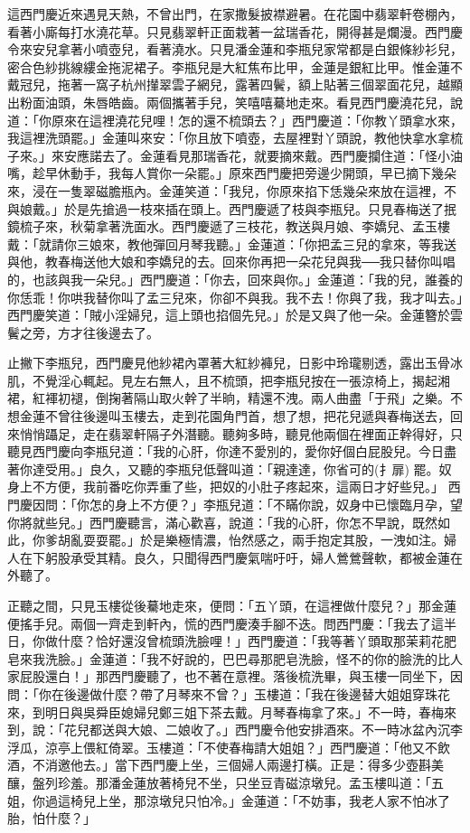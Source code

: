 這西門慶近來遇見天熱，不曾出門，在家撒髮披襟避暑。在花園中翡翠軒卷棚內，看著小廝每打水澆花草。只見翡翠軒正面栽著一盆瑞香花，開得甚是爛漫。西門慶令來安兒拿著小噴壺兒，看著澆水。只見潘金蓮和李瓶兒家常都是白銀條紗衫兒，密合色紗挑線縷金拖泥裙子。李瓶兒是大紅焦布比甲，金蓮是銀紅比甲。惟金蓮不戴冠兒，拖著一窩子杭州攆翠雲子網兒，露著四鬢，額上貼著三個翠面花兒，越顯出粉面油頭，朱唇皓齒。兩個攜著手兒，笑嘻嘻驀地走來。看見西門慶澆花兒，說道：「你原來在這裡澆花兒哩！怎的還不梳頭去？」西門慶道：「你教丫頭拿水來，我這裡洗頭罷。」金蓮叫來安：「你且放下噴壺，去屋裡對丫頭說，教他快拿水拿梳子來。」來安應諾去了。金蓮看見那瑞香花，就要摘來戴。西門慶攔住道：「怪小油嘴，趁早休動手，我每人賞你一朵罷。」原來西門慶把旁邊少開頭，早已摘下幾朵來，浸在一隻翠磁膽瓶內。金蓮笑道：「我兒，你原來掐下恁幾朵來放在這裡，不與娘戴。」於是先搶過一枝來插在頭上。西門慶遞了枝與李瓶兒。只見春梅送了抿鏡梳子來，秋菊拿著洗面水。西門慶遞了三枝花，教送與月娘、李嬌兒、孟玉樓戴：「就請你三娘來，教他彈回月琴我聽。」金蓮道：「你把孟三兒的拿來，等我送與他，教春梅送他大娘和李嬌兒的去。回來你再把一朵花兒與我──我只替你叫唱的，也該與我一朵兒。」西門慶道：「你去，回來與你。」金蓮道：「我的兒，誰養的你恁乖！你哄我替你叫了孟三兒來，你卻不與我。我不去！你與了我，我才叫去。」西門慶笑道：「賊小淫婦兒，這上頭也掐個先兒。」於是又與了他一朵。金蓮簪於雲鬢之旁，方才往後邊去了。

止撇下李瓶兒，西門慶見他紗裙內罩著大紅紗褲兒，日影中玲瓏剔透，露出玉骨冰肌，不覺淫心輒起。見左右無人，且不梳頭，把李瓶兒按在一張涼椅上，揭起湘裙，紅褌初褪，倒掬著隔山取火幹了半晌，精還不洩。兩人曲盡「于飛」之樂。不想金蓮不曾往後邊叫玉樓去，走到花園角門首，想了想，把花兒遞與春梅送去，回來悄悄躡足，走在翡翠軒隔子外潛聽。聽夠多時，聽見他兩個在裡面正幹得好，只聽見西門慶向李瓶兒道：「我的心肝，你達不愛別的，愛你好個白屁股兒。今日盡著你達受用。」良久，又聽的李瓶兒低聲叫道：「親達達，你省可的(扌扉) 罷。奴身上不方便，我前番吃你弄重了些，把奴的小肚子疼起來，這兩日才好些兒。」 西門慶因問：「你怎的身上不方便？」李瓶兒道：「不瞞你說，奴身中已懷臨月孕，望你將就些兒。」西門慶聽言，滿心歡喜，說道：「我的心肝，你怎不早說，既然如此，你爹胡亂耍耍罷。」於是樂極情濃，怡然感之，兩手抱定其股，一洩如注。婦人在下躬股承受其精。良久，只聞得西門慶氣喘吁吁，婦人鶯鶯聲軟，都被金蓮在外聽了。

正聽之間，只見玉樓從後驀地走來，便問：「五丫頭，在這裡做什麼兒？」那金蓮便搖手兒。兩個一齊走到軒內，慌的西門慶湊手腳不迭。問西門慶：「我去了這半日，你做什麼？恰好還沒曾梳頭洗臉哩！」西門慶道：「我等著丫頭取那茉莉花肥皂來我洗臉。」金蓮道：「我不好說的，巴巴尋那肥皂洗臉，怪不的你的臉洗的比人家屁股還白！」那西門慶聽了，也不著在意裡。落後梳洗畢，與玉樓一同坐下，因問：「你在後邊做什麼？帶了月琴來不曾？」玉樓道：「我在後邊替大姐姐穿珠花來，到明日與吳舜臣媳婦兒鄭三姐下茶去戴。月琴春梅拿了來。」不一時，春梅來到，說：「花兒都送與大娘、二娘收了。」西門慶令他安排酒來。不一時冰盆內沉李浮瓜，涼亭上偎紅倚翠。玉樓道：「不使春梅請大姐姐？」西門慶道：「他又不飲酒，不消邀他去。」當下西門慶上坐，三個婦人兩邊打橫。正是：得多少壺斟美釀，盤列珍羞。那潘金蓮放著椅兒不坐，只坐豆青磁涼墩兒。孟玉樓叫道：「五姐，你過這椅兒上坐，那涼墩兒只怕冷。」金蓮道：「不妨事，我老人家不怕冰了胎，怕什麼？」

